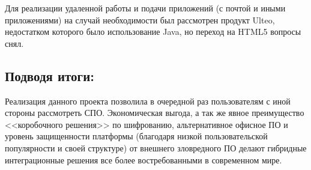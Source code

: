 \documentclass[10pt, a5paper]{article}
\begin{document}
Для реализации удаленной работы и подачи приложений (с почтой и иными приложениями) на случай необходимости был рассмотрен продукт Ulteo, недостатком которого было использование Java, но переход на HTML5 вопросы снял.

\subsection*{Подводя итоги:}

Реализация данного проекта позволила в очередной раз пользователям с иной стороны рассмотреть СПО. Экономическая выгода, а так же явное преимущество <<коробочного решения>> по шифрованию, альтернативное офисное ПО и уровень защищенности платформы (благодаря низкой пользовательской популярности и своей структуре) от внешнего зловредного ПО делают гибридные интеграционные решения все более востребованными в современном мире.
\end{document}
